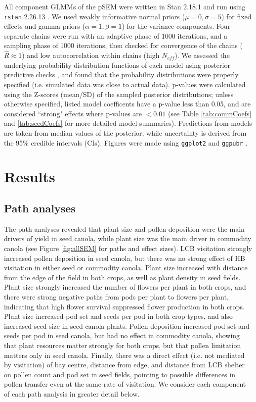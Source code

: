 \documentclass[12pt]{article} %
\begin{document}
All component GLMMs of the pSEM were written in Stan 2.18.1 and run using \texttt{rstan} 2.26.13 \citep{gelman2015, Rstan}.
We used weakly informative normal priors ($\mu=0, \sigma=5$) for fixed effects and gamma priors ($\alpha=1, \beta=1$) for the variance components.
Four separate chains were run with an adaptive phase of 1000 iterations, and a sampling phase of 1000 iterations, then checked for convergence of the chains ($\hat{R} \approx$1) and low autocorrelation within chains (high $N_{eff}$).
We assessed the underlying probability distribution functions of each model using posterior predictive checks \citep{gelman2013}, and found that the probability distributions were properly specified (i.e. simulated data was close to actual data).
p-values were calculated using the Z-scores (mean/SD) of the sampled posterior distributions; unless otherwise specified, listed model coefficents have a p-value less than 0.05, and are considered ``strong" effects where p-values are $<0.01$ (see Table \ref{tab:commCoefs} and \ref{tab:seedCoefs} for more detailed model summaries). 
Predictions from models are taken from median values of the posterior, while uncertainty is derived from the 95\% credible intervals (CIs).
Figures were made using \texttt{ggplot2} and \texttt{ggpubr} \citep{wickham2016, kassambara2020}.

\section*{Results}

\subsection*{Path analyses}
The path analyses revealed that plant size and pollen deposition were the main drivers of yield in seed canola, while plant size was the main driver in commodity canola (see Figure \ref{fig:allSEM} for paths and effect sizes). 
LCB visitation strongly increased pollen deposition in seed canola, but there was no strong effect of HB visitation in either seed or commodity canola.
Plant size increased with distance from the edge of the field in both crops, as well as plant density in seed fields.
Plant size strongly increased the number of flowers per plant in both crops, and there were strong negative paths from pods per plant to flowers per plant, indicating that high flower survival suppressed flower production in both crops.
Plant size increased pod set and seeds per pod in both crop types, and also increased seed size in seed canola plants.
Pollen deposition increased pod set and seeds per pod in seed canola, but had no effect in commodity canola, showing that plant resources matter strongly for both crops, but that pollen limitation matters only in seed canola.
Finally, there was a direct effect (i.e. not mediated by visitation) of bay centre, distance from edge, and distance from LCB shelter on pollen count and pod set in seed fields, pointing to possible differences in pollen transfer even at the same rate of visitation. 
We consider each component of each path analysis in greater detail below.
\end{document}
